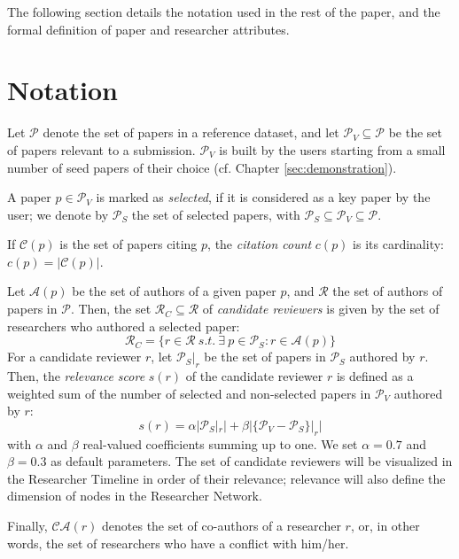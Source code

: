 The following section details the notation used in the rest of the paper, and the formal definition of paper and researcher attributes. 

\section{Notation}
\label{sec:notation}
Let $\mathcal{P}$ denote the set of papers in a reference dataset, %
and let $\mathcal{P}_{V} \subseteq \mathcal{P}$ be the set of papers relevant to a submission. %
$\mathcal{P}_{V}$ is built by the users starting from a small number of seed papers of their choice (cf. Chapter \ref{sec:demonstration}).%

A paper $p \in \mathcal{P}_{V}$ is marked as \emph{selected}, if it is considered as a key paper by the user; we denote by $\mathcal{P}_{S}$ the set of selected papers, with $\mathcal{P}_{S} \subseteq \mathcal{P}_{V} \subseteq \mathcal{P}$. 

If $\mathcal{C}(p)$ is the set of papers citing $p$, the \emph{citation count} $c(p)$ is its cardinality: $c(p) = \vert \mathcal{C}(p) \vert$.

Let $\mathcal{A}(p)$ be the set of authors of a given paper $p$, and $\mathcal{R}$ the set of authors of papers in $\mathcal{P}$. 
Then, the set $\mathcal{R}_C \subseteq \mathcal{R}$ of \emph{candidate reviewers} is given by the set of researchers who authored a selected paper: $$\mathcal{R}_{C} = \{r \in \mathcal{R} \ s.t. \ \exists \ p \in \mathcal{P}_S : r \in \mathcal{A}(p)\}$$ %
%
For a candidate reviewer $r$, let $\mathcal{P}_{S}|_{r}$ be the set of papers in $\mathcal{P}_{S}$ authored by $r$. Then, the \emph{relevance score} $s(r)$ of the candidate reviewer $r$ is defined as a weighted sum of the number of selected and non-selected papers in $\mathcal{P}_V$ authored by $r$: $$s(r) = \alpha \vert \mathcal{P}_{S}|_{r} \vert + \beta \vert \{\mathcal{P}_{V} - \mathcal{P}_{S}\}|_{r}\vert$$ with $\alpha$ and $\beta$ real-valued coefficients summing up to one. We set $\alpha = 0.7$ and $\beta = 0.3$ as default parameters. The set of candidate reviewers will be visualized in the Researcher Timeline in order of their relevance; relevance will also define the dimension of nodes in the Researcher Network.

Finally, $\mathcal{CA}(r)$ denotes the set of co-authors of a researcher $r$, or, in other words, the set of researchers who have a conflict with him/her. 